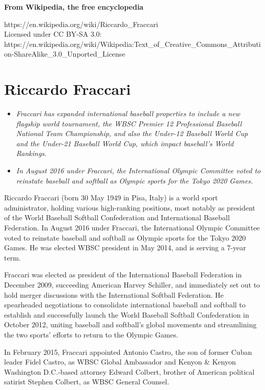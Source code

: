 \textbf{From Wikipedia, the free encyclopedia}

https://en.wikipedia.org/wiki/Riccardo\_Fraccari\\
Licensed under CC BY-SA 3.0:\\
https://en.wikipedia.org/wiki/Wikipedia:Text\_of\_Creative\_Commons\_Attribution-ShareAlike\_3.0\_Unported\_License

\section{Riccardo Fraccari}\label{riccardo-fraccari}

\begin{itemize}
\item
  \emph{Fraccari has expanded international baseball properties to
  include a new flagship world tournament, the WBSC Premier 12
  Professional Baseball National Team Championship, and also the
  Under-12 Baseball World Cup and the Under-21 Baseball World Cup, which
  impact baseball's World Rankings.}
\item
  \emph{In August 2016 under Fraccari, the International Olympic
  Committee voted to reinstate baseball and softball as Olympic sports
  for the Tokyo 2020 Games.}
\end{itemize}

Riccardo Fraccari (born 30 May 1949 in Pisa, Italy) is a world sport
administrator, holding various high-ranking positions, most notably as
president of the World Baseball Softball Confederation and International
Baseball Federation. In August 2016 under Fraccari, the International
Olympic Committee voted to reinstate baseball and softball as Olympic
sports for the Tokyo 2020 Games. He was elected WBSC president in May
2014, and is serving a 7-year term.

Fraccari was elected as president of the International Baseball
Federation in December 2009, succeeding American Harvey Schiller, and
immediately set out to hold merger discussions with the International
Softball Federation. He spearheaded negotiations to consolidate
international baseball and softball to establish and successfully launch
the World Baseball Softball Confederation in October 2012, uniting
baseball and softball's global movements and streamlining the two
sports' efforts to return to the Olympic Games.

In February 2015, Fraccari appointed Antonio Castro, the son of former
Cuban leader Fidel Castro, as WBSC Global Ambassador and Kenyon \&
Kenyon Washington D.C.-based attorney Edward Colbert, brother of
American political satirist Stephen Colbert, as WBSC General Counsel.

